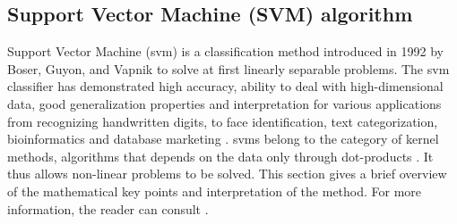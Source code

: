 

\subsection{Support Vector Machine (SVM) algorithm}
\label{sec:svm}

Support Vector Machine ({\sc svm}) is a classification method introduced in 1992 by Boser, Guyon, and Vapnik \cite{Boser1992,Cortes1995} to solve at first linearly separable problems. The {\sc svm} classifier has demonstrated high accuracy, ability to deal with high-dimensional data, good generalization properties and interpretation for various applications from recognizing handwritten digits, to face identification, text categorization, bioinformatics and database marketing \cite{Wang2002,Yang1999,Heisele2001,Sadri2003,Campbell2011}. {\sc svm}s belong to the category of kernel methods, algorithms that depends on the data only through dot-products \cite{Schlkopf2013}. It thus allows non-linear problems to be solved. This section gives a brief overview of the mathematical key points and interpretation of the method. For more information, the reader can consult \cite{Schlkopf2013,Campbell2011,Cortes1995}.

